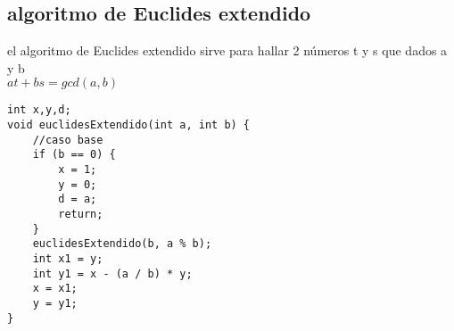 \subsection{algoritmo de Euclides extendido}
el algoritmo de Euclides extendido sirve para hallar 2 números t y s que dados a y b\\
$at+bs=gcd(a,b)$
\begin{lstlisting}[style=C,caption=euclidesExtendido.cpp]
int x,y,d;
void euclidesExtendido(int a, int b) {
    //caso base
	if (b == 0) {
        x = 1;
        y = 0;
        d = a;
        return;
    }
	euclidesExtendido(b, a % b);
	int x1 = y;
	int y1 = x - (a / b) * y;
	x = x1;
	y = y1;
}
\end{lstlisting}
